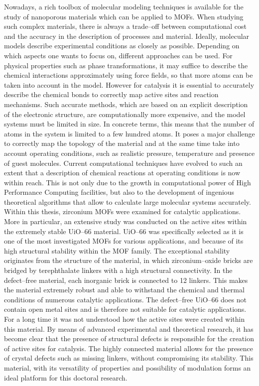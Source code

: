 \npar
Nowadays, a rich toolbox of molecular modeling techniques is available for the study of nanoporous materials which can be applied to MOFs. When studying such complex materials, there is always a trade--off between computational cost and the accuracy in the description of processes and material. Ideally, molecular models describe experimental conditions as closely as possible. Depending on which aspects one wants to focus on, different approaches can be used. For physical properties such as phase transformations, it may suffice to describe the chemical interactions approximately using force fields, so that more atoms can be taken into account in the model. However for catalysis it is essential to accurately describe the chemical bonds to correctly map active sites and reaction mechanisms. Such accurate methods, which are based on an explicit description of the electronic structure, are computationally more expensive, and the model systems must be limited in size. In concrete terms, this means that the number of atoms in the system is limited to a few hundred atoms. It poses a major challenge to correctly map the topology of the material and at the same time take into account operating conditions, such as realistic pressure, temperature and presence of guest molecules. Current computational techniques have evolved to such an extent that a description of chemical reactions at operating conditions is now within reach. This is not only due to the growth in computational power of High Performance Computing facilities, but also to the development of ingenious theoretical algorithms that allow to calculate large molecular systems accurately.
\npar
Within this thesis, zirconium MOFs were examined for catalytic applications. More in particular, an extensive study was conducted on the active sites within the extremely stable UiO--66 material. UiO--66 was specifically selected as it is one of the most investigated MOFs for various applications, and because of its high structural stability within the MOF family. The exceptional stability originates from the structure of the material, in which zirconium--oxide bricks are bridged by terephthalate linkers with a high structural connectivity. In the defect--free material, each inorganic brick is connected to 12 linkers. This makes the material extremely robust and able to withstand the chemical and thermal conditions of numerous catalytic applications. The defect--free UiO--66 does not contain open metal sites and is therefore not suitable for catalytic applications. For a long time it was not understood how the active sites were created within this material. By means of advanced experimental and theoretical research, it has become clear that the presence of structural defects is responsible for the creation of active sites for catalysis. The highly connected material allows for the presence of crystal defects such as missing linkers, without compromising its stability. This material, with its versatility of properties and possibility of modulation forms an ideal platform for this doctoral research.
